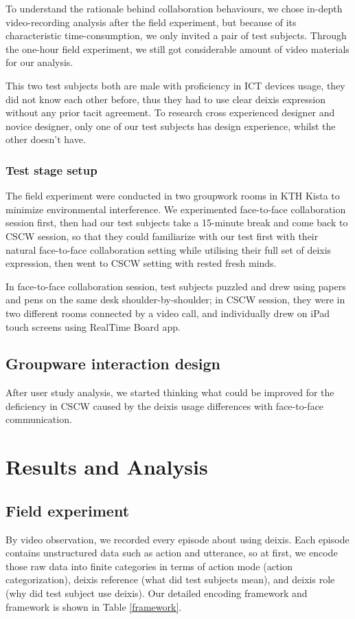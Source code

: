 \documentclass[12pt,twoside]{article}
\begin{document}
To understand the rationale behind collaboration behaviours, we chose in-depth video-recording analysis after the field experiment, but because of its characteristic time-consumption, we only invited a pair of test subjects. Through the one-hour field experiment, we still got considerable amount of video materials for our analysis.

This two test subjects both are male with proficiency in ICT devices usage, they did not know each other before, thus they had to use clear deixis expression without any prior tacit agreement. To research cross experienced designer and novice designer, only one of our test subjects has design experience, whilst the other doesn't have. 

\subsubsection{Test stage setup}

The field experiment were conducted in two groupwork rooms in KTH Kista to minimize environmental interference. We experimented face-to-face collaboration session first, then had our test subjects take a 15-minute break and come back to CSCW session, so that they could familiarize with our test first with their natural face-to-face collaboration setting while utilising their full set of deixis expression, then went to CSCW setting with rested fresh minds.

In face-to-face collaboration session, test subjects puzzled and drew using papers and pens on the same desk shoulder-by-shoulder; in CSCW session, they were in two different rooms connected by a video call, and individually drew on iPad touch screens using RealTime Board app.

\subsection{Groupware interaction design}
\label{sect:groupware}
After user study analysis, we started thinking what could be improved for the deficiency in CSCW caused by the deixis usage differences with face-to-face communication.

\section{Results and Analysis}
\label{sec:results}

\subsection{Field experiment}
By video observation, we recorded every episode about using deixis. Each episode contains unstructured data such as action and utterance, so at first, we encode those raw data into finite categories in terms of action mode (action categorization), deixis reference (what did test subjects mean), and deixis role (why did test subject use deixis). Our detailed encoding framework and framework is shown in Table \ref{framework}.
\end{document}
